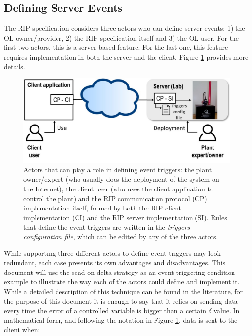 \subsection{Defining Server Events}
The RIP specification considers three actors who can define server events: 1) the OL owner/provider, 2) the RIP specification itself and 3) the OL user. For the first two actors, this is a server-based feature. For the last one, this feature requires implementation in both the server and the client. Figure \ref{fig:actors} provides more details.

\begin{figure}[b!]
\begin{center}
\centering
\includegraphics[width=\columnwidth]{images/actors.pdf}
\caption{Actors that can play a role in defining event triggers: the plant owner/expert (who usually does the deployment of the system on the Internet), the client user (who uses the client application to control the plant) and the RIP communication protocol (CP) implementation itself, formed by both the RIP client implementation (CI) and the RIP server implementation (SI). Rules that define the event triggers are written in the \textit{triggers configuration file}, which can be edited by any of the three actors.}
\label{fig:actors}
\end{center}
\end{figure}

While supporting three different actors to define event triggers may look redundant, each case presents its own advantages and disadvantages. This document will use the send-on-delta strategy as an event triggering condition example to illustrate the way each of the actors could define and implement it. While a detailed description of this technique can be found in the literature, for the purpose of this document it is enough to say that it relies on sending data every time the error of a controlled variable is bigger than a certain $\delta$ value. In mathematical form, and following the notation in Figure \ref{fig:actors}, data is sent to the client when:


